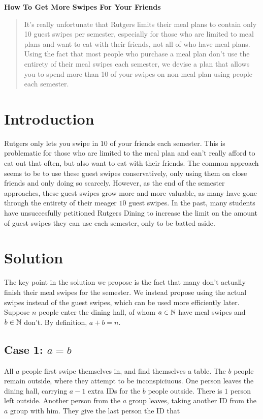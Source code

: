 \documentclass{article}
\begin{document}
\begin{center}
  \Large \textbf{How To Get More Swipes For Your Friends}
\end{center}

\begin{abstract}
  It's really unfortunate that Rutgers limits their meal plans to contain only 10 guest swipes per semester,
  especially for those who are limited to meal plans and want to eat with their friends,
  not all of who have meal plans.
  Using the fact that most people who purchase a meal plan don't use the entirety of their meal swipes each semester,
  we devise a plan that allows you to spend more than 10 of your swipes on non-meal plan using people each semester.
\end{abstract}

\section{Introduction}
Rutgers only lets you swipe in $10$ of your friends each semester.
This is problematic for those who are limited to the meal plan and can't really afford to eat out that often,
but also want to eat with their friends.
The common approach seems to be to use these guest swipes conservatively,
only using them on close friends and only doing so scarcely.
However,
as the end of the semester approaches,
these guest swipes grow more and more valuable,
as many have gone through the entirety of their meager $10$ guest swipes.
In the past,
many students have unsuccesfully petitioned Rutgers Dining to increase the limit on the amount of guest swipes they can use each semester,
only to be batted aside.

\section{Solution}
The key point in the solution we propose is the fact that many don't actually finish their meal swipes for the semester.
We instead propose using the actual swipes instead of the guest swipes,
which can be used more efficiently later.
Suppose $n$ people enter the dining hall,
of whom $a \in \mathbb N$ have meal swipes and $b \in \mathbb N$ don't.
By definition,
$a + b = n$.

\subsection{Case 1: $a = b$}
All $a$ people first swipe themselves in,
and find themselves a table.
The $b$ people remain outside,
where they attempt to be inconspiciuous.
One person leaves the dining hall,
carrying $a-1$ extra IDs for the $b$ people outside.
There is $1$ person left outside.
Another person from the $a$ group leaves,
taking another ID from the $a$ group with him.
They give the last person the ID that 
\end{document}
